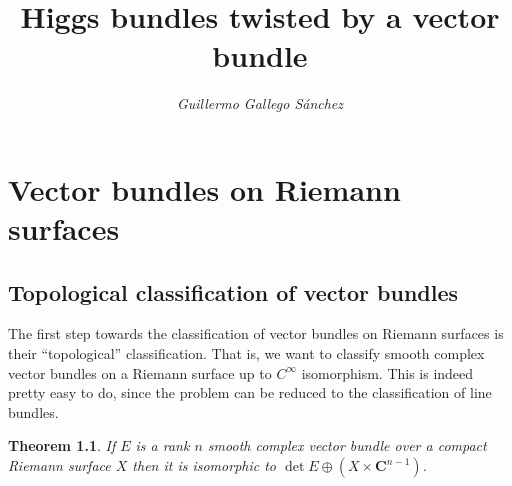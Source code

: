 \documentclass[12pt,a4paper]{book}
\title{\bfseries \sffamily Higgs bundles twisted by a vector bundle}
\author{\it Guillermo Gallego Sánchez}
\date{}
\newtheorem{thm}{Theorem}[section]
\theoremstyle{definition} \newtheorem{defn}[thm]{Definition}
\theoremstyle{definition} \newtheorem{ejemplo}[thm]{Example}
\theoremstyle{remark} \newtheorem{rem}[thm]{Remark}
\def\CC{\mathbf{C}}
\begin{document}
\maketitle
\tableofcontents
\chapter{Vector bundles on Riemann surfaces}
\section{Topological classification of vector bundles}
The first step towards the classification of vector bundles on Riemann surfaces is their ``topological'' classification. That is, we want to classify smooth complex vector bundles on a Riemann surface up to $C^\infty$ isomorphism. This is indeed pretty easy to do, since the problem can be reduced to the classification of line bundles.
\begin{thm}
  If $E$ is a rank $n$ smooth complex vector bundle over a compact Riemann surface $X$ then it is isomorphic to $\det E \oplus (X\times \CC^{n-1})$.
\end{thm}
\end{document}
